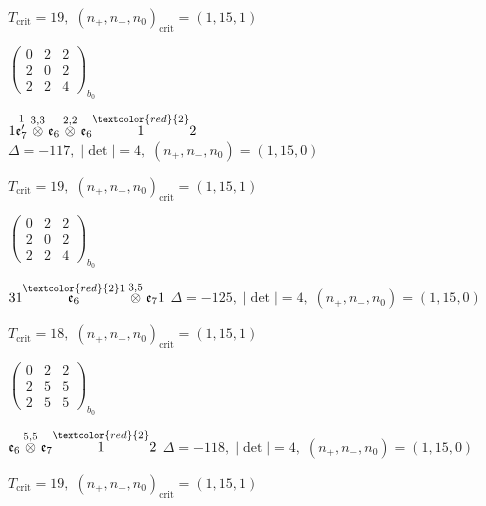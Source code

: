\documentclass[10pt]{article}
\begin{document}
\hspace{1em}$T_{\text{crit}}=19,\; (n_+,n_-,n_0)_{\text{crit}}=(1,15,1)$

\hspace{2em}$\left(\begin{smallmatrix}0 & 2 & 2 \\ 2 & 0 & 2 \\ 2 & 2 & 4\end{smallmatrix}\right)_{\!b_0}$

\smallskip

$1\overset{1}{\mathfrak{e}_7'}\overset{3,3}{\otimes}\mathfrak{e}_6\overset{2,2}{\otimes}\mathfrak{e}_6\overset{\textcolor{red}{2}}{1}2$ \quad $\Delta=-117,\; |\det|=4,\; (n_+,n_-,n_0)=(1,15,0)$

\hspace{1em}$T_{\text{crit}}=19,\; (n_+,n_-,n_0)_{\text{crit}}=(1,15,1)$

\hspace{2em}$\left(\begin{smallmatrix}0 & 2 & 2 \\ 2 & 0 & 2 \\ 2 & 2 & 4\end{smallmatrix}\right)_{\!b_0}$

\smallskip

$31\overset{\textcolor{red}{2}1}{\mathfrak{e}_6}\overset{3,5}{\otimes}\mathfrak{e}_71$ \quad $\Delta=-125,\; |\det|=4,\; (n_+,n_-,n_0)=(1,15,0)$

\hspace{1em}$T_{\text{crit}}=18,\; (n_+,n_-,n_0)_{\text{crit}}=(1,15,1)$

\hspace{2em}$\left(\begin{smallmatrix}0 & 2 & 2 \\ 2 & 5 & 5 \\ 2 & 5 & 5\end{smallmatrix}\right)_{\!b_0}$

\smallskip

$\mathfrak{e}_6\overset{5,5}{\otimes}\mathfrak{e}_7\overset{\textcolor{red}{2}}{1}2$ \quad $\Delta=-118,\; |\det|=4,\; (n_+,n_-,n_0)=(1,15,0)$

\hspace{1em}$T_{\text{crit}}=19,\; (n_+,n_-,n_0)_{\text{crit}}=(1,15,1)$
\end{document}

